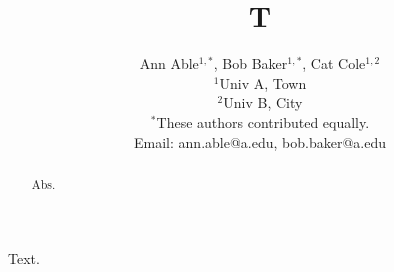 \documentclass[aps,pra,superscriptaddress]{revtex4-2}
\begin{document}
\title{T}
\author{Ann Able$^{1,*}$, Bob Baker$^{1,*}$, Cat Cole$^{1,2}$ \\
\normalsize{$^{1}$Univ A, Town}\\
\normalsize{$^{2}$Univ B, City} \\
\normalsize{$^*$These authors contributed equally. \\
Email: ann.able@a.edu, bob.baker@a.edu}}
\begin{abstract}
Abs.
\end{abstract}
\maketitle
Text.
\end{document}
